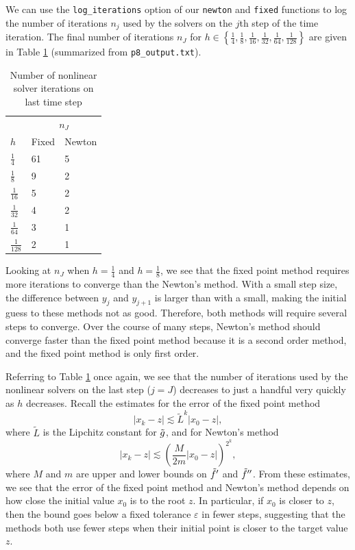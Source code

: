 \documentclass{homework}
\begin{document}
\begin{alphaparts}
		\questionpart 
		We can use the \verb*|log_iterations| option of our \verb*|newton| and \verb*|fixed| functions to log the number of iterations $n_j$ used by the solvers on the $j$th step of the time iteration. The final number of iterations $n_J$ for $h \in \left\{\frac{1}{4}, \frac{1}{8}, \frac{1}{16}, \frac{1}{32}, \frac{1}{64}, \frac{1}{128}\right\}$ are given in Table \ref{table:p8:d} (summarized from \verb*|p8_output.txt|).
		\begin{table}[H]
			\centering
			\begin{tabular}{@{}lll@{}}
				\toprule
				& \multicolumn{2}{c}{$n_J$} \\
				\cmidrule{2-3}
				$h$ & Fixed & Newton \\
				\midrule 
				$\frac{1}{4}$ & 61 & 5 \\[0.4em]
				$\frac{1}{8}$ & 9 & 2 \\[0.4em]
				$\frac{1}{16}$ & 5 & 2 \\[0.4em]
				$\frac{1}{32}$ & 4 & 2 \\[0.4em]
				$\frac{1}{64}$ & 3 & 1 \\[0.4em]
				$\frac{1}{128}$ & 2 & 1 \\[0.4em]
				\bottomrule
			\end{tabular}
			\caption{Number of nonlinear solver iterations on last time step}
			\label{table:p8:d}
		\end{table}
		Looking at $n_J$ when $h = \frac{1}{4}$ and $h = \frac{1}{8}$, we see that the fixed point method requires more iterations to converge than the Newton's method. With a small step size, the difference between $y_j$ and $y_{j+1}$ is larger than with a small, making the initial guess to these methods not as good. Therefore, both methods will require several steps to converge. Over the course of many steps, Newton's method should converge faster than the fixed point method because it is a second order method, and the fixed point method is only first order.
		
		\questionpart Referring to Table \ref{table:p8:d} once again, we see that the number of iterations used by the nonlinear solvers on the last step ($j=J$) decreases to just a handful very quickly as $h$ decreases. Recall the estimates for the error of the fixed point method
		\begin{equation}
			|x_k - z| \lesssim \tilde{L}^k |x_0 - z|,
		\end{equation}
		where $\tilde{L}$ is the Lipchitz constant for $\tilde{g}$, and for Newton's method
		\begin{equation}
			|x_k - z| \lesssim \left(\frac{M}{2m}|x_0 - z|\right)^{2^k},
		\end{equation}
		where $M$ and $m$ are upper and lower bounds on $\tilde{f}'$ and $\tilde{f}''$. From these estimates, we see that the error of the fixed point method and Newton's method depends on how close the initial value $x_0$ is to the root $z$. In particular, if $x_0$ is closer to $z$, then the bound goes below a fixed tolerance $\varepsilon$ in fewer steps, suggesting that the methods both use fewer steps when their initial point is closer to the target value $z$.
		

\end{alphaparts}
\end{document}

